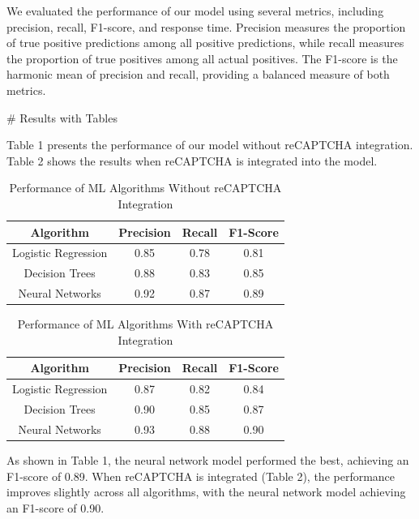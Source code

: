 We evaluated the performance of our model using several metrics, including precision, recall, F1-score, and response time. Precision measures the proportion of true positive predictions among all positive predictions, while recall measures the proportion of true positives among all actual positives. The F1-score is the harmonic mean of precision and recall, providing a balanced measure of both metrics.

# Results with Tables

Table 1 presents the performance of our model without reCAPTCHA integration. Table 2 shows the results when reCAPTCHA is integrated into the model.

\begin{table}[ht]
    \centering
    \begin{tabular}{|c|c|c|c|}
    \hline
    \textbf{Algorithm} & \textbf{Precision} & \textbf{Recall} & \textbf{F1-Score} \\
    \hline
    Logistic Regression & 0.85 & 0.78 & 0.81 \\
    Decision Trees & 0.88 & 0.83 & 0.85 \\
    Neural Networks & 0.92 & 0.87 & 0.89 \\
    \hline
    \end{tabular}
    \caption{Performance of ML Algorithms Without reCAPTCHA Integration}
    \label{tab:without_reCaptcha}
\end{table}

\begin{table}[ht]
    \centering
    \begin{tabular}{|c|c|c|c|}
    \hline
    \textbf{Algorithm} & \textbf{Precision} & \textbf{Recall} & \textbf{F1-Score} \\
    \hline
    Logistic Regression & 0.87 & 0.82 & 0.84 \\
    Decision Trees & 0.90 & 0.85 & 0.87 \\
    Neural Networks & 0.93 & 0.88 & 0.90 \\
    \hline
    \end{tabular}
    \caption{Performance of ML Algorithms With reCAPTCHA Integration}
    \label{tab:with_reCaptcha}
\end{table}

As shown in Table 1, the neural network model performed the best, achieving an F1-score of 0.89. When reCAPTCHA is integrated (Table 2), the performance improves slightly across all algorithms, with the neural network model achieving an F1-score of 0.90.

